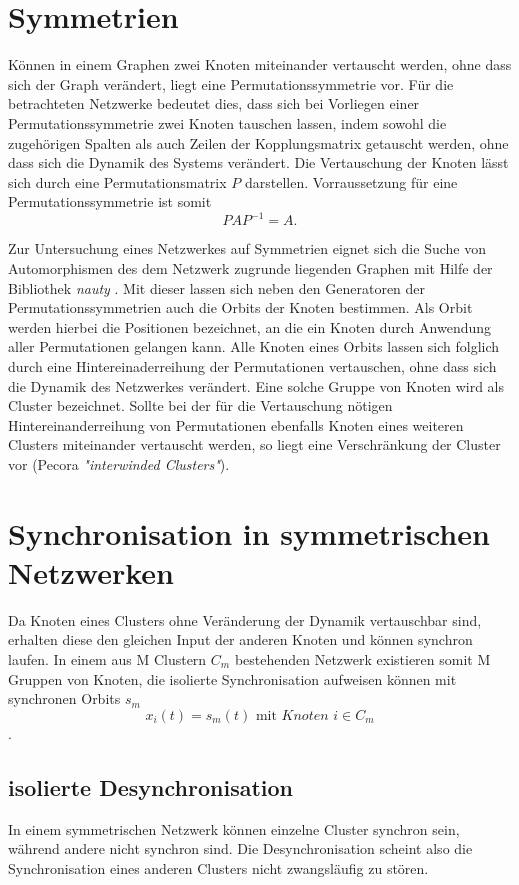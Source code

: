 \section{Symmetrien}
Können in einem Graphen zwei Knoten miteinander vertauscht werden, ohne dass sich der Graph verändert, liegt eine Permutationssymmetrie vor. Für die betrachteten Netzwerke bedeutet dies, dass sich bei Vorliegen einer Permutationssymmetrie zwei Knoten tauschen lassen, indem sowohl die zugehörigen Spalten als auch Zeilen der Kopplungsmatrix getauscht werden, ohne dass sich die Dynamik des Systems verändert. Die Vertauschung der Knoten lässt sich durch eine Permutationsmatrix $P$ darstellen. Vorraussetzung für eine Permutationssymmetrie ist somit
\begin{equation}
PAP^{-1}=A.
\end{equation}

Zur Untersuchung eines Netzwerkes auf Symmetrien eignet sich die Suche von Automorphismen des dem Netzwerk zugrunde liegenden Graphen mit Hilfe der Bibliothek \textit{nauty} \cite{nauty}. Mit dieser lassen sich neben den Generatoren der Permutationssymmetrien auch die Orbits der Knoten bestimmen. Als Orbit werden hierbei die Positionen bezeichnet, an die ein Knoten durch Anwendung aller Permutationen gelangen kann. Alle Knoten eines Orbits lassen sich folglich durch eine Hintereinaderreihung der Permutationen vertauschen, ohne dass sich die Dynamik des Netzwerkes verändert. Eine solche Gruppe von Knoten wird als Cluster bezeichnet. Sollte bei der für die Vertauschung nötigen Hintereinanderreihung von Permutationen ebenfalls Knoten eines weiteren Clusters miteinander vertauscht werden, so liegt eine Verschränkung der Cluster vor (Pecora\citep{pecora2014} \textit{"interwinded Clusters"}).

\section{Synchronisation in symmetrischen Netzwerken}
Da Knoten eines Clusters ohne Veränderung der Dynamik vertauschbar sind, erhalten diese den gleichen Input der anderen Knoten und können synchron laufen. In einem aus M Clustern $C_m$ bestehenden Netzwerk existieren somit M Gruppen von Knoten, die isolierte Synchronisation aufweisen können mit synchronen Orbits $s_m$
\begin{equation}
x_i(t)=s_m(t) \text{ mit } \textit{Knoten } i\in C_m
\end{equation}.

{\subsection*{isolierte Desynchronisation}}
In einem symmetrischen Netzwerk können einzelne Cluster synchron sein, während andere nicht synchron sind. Die Desynchronisation scheint also die Synchronisation eines anderen Clusters nicht zwangsläufig zu stören.

